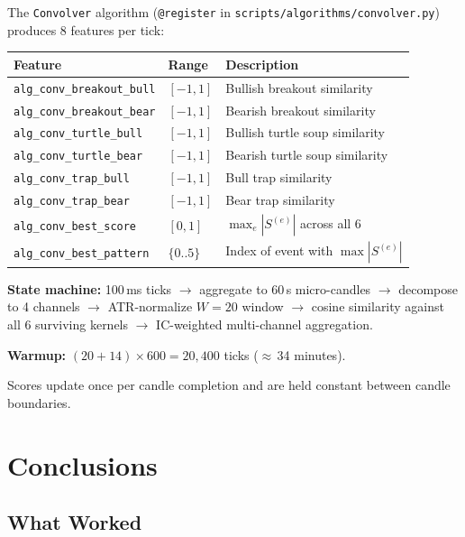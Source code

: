 \documentclass[11pt,a4paper]{article}
\begin{document}
The \texttt{Convolver} algorithm (\texttt{@register} in
\texttt{scripts/algorithms/convolver.py}) produces 8 features per tick:

\begin{center}
\small
\begin{tabular}{llp{7cm}}
\hline
\textbf{Feature} & \textbf{Range} & \textbf{Description} \\
\hline
\texttt{alg\_conv\_breakout\_bull}  & $[-1, 1]$   & Bullish breakout similarity \\
\texttt{alg\_conv\_breakout\_bear}  & $[-1, 1]$   & Bearish breakout similarity \\
\texttt{alg\_conv\_turtle\_bull}    & $[-1, 1]$   & Bullish turtle soup similarity \\
\texttt{alg\_conv\_turtle\_bear}    & $[-1, 1]$   & Bearish turtle soup similarity \\
\texttt{alg\_conv\_trap\_bull}      & $[-1, 1]$   & Bull trap similarity \\
\texttt{alg\_conv\_trap\_bear}      & $[-1, 1]$   & Bear trap similarity \\
\texttt{alg\_conv\_best\_score}     & $[0, 1]$    & $\max_e |S^{(e)}|$ across all 6 \\
\texttt{alg\_conv\_best\_pattern}   & $\{0..5\}$  & Index of event with $\max |S^{(e)}|$ \\
\hline
\end{tabular}
\end{center}

\textbf{State machine:} 100\,ms ticks $\to$ aggregate to 60\,s
micro-candles $\to$ decompose to 4 channels $\to$ ATR-normalize $W{=}20$
window $\to$ cosine similarity against all 6 surviving kernels $\to$
IC-weighted multi-channel aggregation.

\textbf{Warmup:} $(20 + 14) \times 600 = 20{,}400$ ticks
($\approx$\,34 minutes).

Scores update once per candle completion and are held constant between candle
boundaries.

\section{Conclusions}

\subsection{What Worked}
\end{document}

